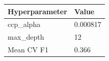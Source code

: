 \begin{tabular}{ll}
\toprule
Hyperparameter & Value \\
\midrule
ccp\_alpha & 0.000817 \\
max\_depth & 12 \\
\midrule
Mean CV F1 & 0.366 \\
\bottomrule
\end{tabular}
